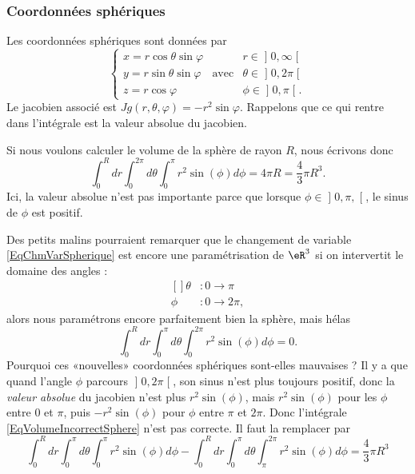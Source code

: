 \subsubsection{Coordonnées sphériques}

Les coordonnées sphériques sont données par
\begin{equation}		\label{EqChmVarSpherique}
	\left\{
\begin{array}{lllll}
x=r\cos\theta\sin\varphi	&			&r\in\mathopen] 0 , \infty \mathclose[\\
y=r\sin\theta\sin\varphi	&	\text{avec}	&\theta\in\mathopen] 0 , 2\pi \mathclose[\\
z=r\cos\varphi			&			&\phi\in\mathopen] 0 , \pi \mathclose[.
\end{array}
\right.
\end{equation}
Le jacobien associé est $Jg(r,\theta,\varphi)=-r^2\sin\varphi$. Rappelons que ce qui rentre dans l'intégrale est la valeur absolue du jacobien.

Si nous voulons calculer le volume de la sphère de rayon $R$, nous écrivons donc
\begin{equation}
	\int_0^Rdr\int_{0}^{2\pi}d\theta\int_0^{\pi}r^2 \sin(\phi)d\phi=4\pi R=\frac{ 4 }{ 3 }\pi R^3.
\end{equation}
Ici, la valeur absolue n'est pas importante parce que lorsque $\phi\in\mathopen] 0,\pi ,  \mathclose[$, le sinus de $\phi$ est positif.

Des petits malins pourraient remarquer que le changement de variable \eqref{EqChmVarSpherique} est encore une paramétrisation de $\eR^3$ si on intervertit le domaine des angles : 
\begin{equation}
	\begin{aligned}[]
		\theta&\colon 0 \to \pi\\
		\phi	&\colon 0\to 2\pi,
	\end{aligned}
\end{equation}
alors nous paramétrons encore parfaitement bien la sphère, mais hélas
\begin{equation}		\label{EqVolumeIncorrectSphere}
	\int_0^Rdr\int_{0}^{\pi}d\theta\int_0^{2\pi}r^2 \sin(\phi)d\phi=0.
\end{equation}
Pourquoi ces «nouvelles» coordonnées sphériques sont-elles mauvaises ? Il y a que quand l'angle $\phi$ parcours $\mathopen] 0 , 2\pi \mathclose[$, son sinus n'est plus toujours positif, donc la \emph{valeur absolue} du jacobien n'est plus $r^2\sin(\phi)$, mais $r^2\sin(\phi)$ pour les $\phi$ entre $0$ et $\pi$, puis $-r^2\sin(\phi)$ pour $\phi$ entre $\pi$ et $2\pi$. Donc l'intégrale \eqref{EqVolumeIncorrectSphere} n'est pas correcte. Il faut la remplacer par
\begin{equation}
	\int_0^Rdr\int_{0}^{\pi}d\theta\int_0^{\pi}r^2 \sin(\phi)d\phi- \int_0^Rdr\int_{0}^{\pi}d\theta\int_{\pi}^{2\pi}r^2 \sin(\phi)d\phi = \frac{ 4 }{ 3 }\pi R^3
\end{equation}

